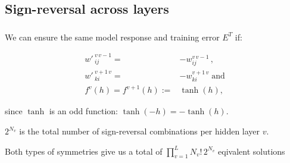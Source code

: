 \subsection{Sign-reversal across layers}

\begin{frame}\frametitle{\subsecname}


We can ensure the same model response and training error $E^{T}$ if:


\begin{align}
{w'\,}^{v\,v-1}_{ij} =& -w^{v\,v-1}_{ij}\,,\\
{w'\,}^{v+1\,v}_{ki} =& -w^{v+1\,v}_{ki} \; \text{and}\\
f^{v}(h) = f^{v+1}(h) :=& \tanh(h),
\end{align}

since $\tanh$ is an odd function: $\tanh(-h) = -\tanh(h)$.

$2^{N_{v}}$ is the total number of sign-reversal combinations per hidden layer $v$.

Both types of symmetries give us 
a total of $\prod_{v=1}^{L} N_{v}!\, 2^{N_{v}}$ eqivalent solutions

  
\end{frame}

